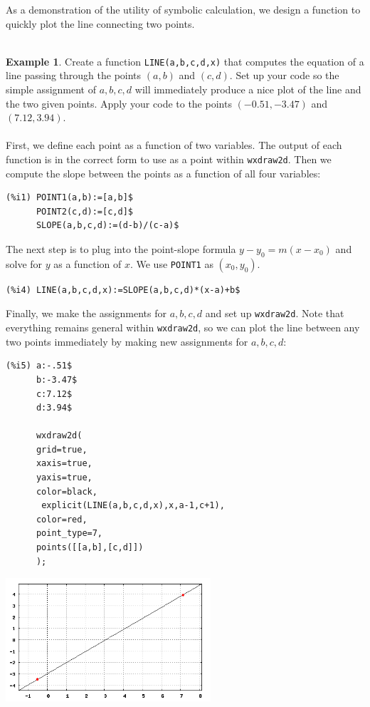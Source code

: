 \documentclass[10.5pt,twoside]{report}
\theoremstyle{definition}
\newtheorem{exmp}{Example}[section]
\begin{document}
As a demonstration of the utility of symbolic calculation, we design a function to quickly plot the line connecting two points.\\
${}$\\
\begin{exmp}  Create a function \verb|LINE(a,b,c,d,x)| that computes the equation of a line passing through the points $(a,b)$ and $(c,d)$.  Set up your code so the simple assignment of $a,b,c,d$ will immediately produce a nice plot of the line and the two given points.  Apply your code to the points $(-0.51,-3.47)$ and $(7.12,3.94)$.\\
${}$\\


First, we define each point as a function of two variables.  The output of each function is in the correct form to use as a point within \verb|wxdraw2d|.  Then we compute the slope between the points as a function of all four variables:\\

\begin{verbatim}
(%i1) POINT1(a,b):=[a,b]$
      POINT2(c,d):=[c,d]$
      SLOPE(a,b,c,d):=(d-b)/(c-a)$  
\end{verbatim}

The next step is to plug into the point-slope formula $y-y_0=m(x-x_0)$ and solve for $y$ as a function of $x$.  We use \verb|POINT1| as $(x_0,y_0)$.
           
\begin{verbatim}           
(%i4) LINE(a,b,c,d,x):=SLOPE(a,b,c,d)*(x-a)+b$
\end{verbatim}

Finally, we make the assignments for $a,b,c,d$ and set up \verb|wxdraw2d|.  Note that everything remains general within \verb|wxdraw2d|, so we can plot the line between any two points immediately by making new assignments for $a,b,c,d$:

\begin{verbatim}
(%i5) a:-.51$
      b:-3.47$
      c:7.12$
      d:3.94$

      wxdraw2d(
      grid=true,
      xaxis=true,
      yaxis=true,
      color=black,
       explicit(LINE(a,b,c,d,x),x,a-1,c+1),
      color=red,
      point_type=7,
      points([[a,b],[c,d]])
      );
\end{verbatim}

\includegraphics[width=3in]{example_0_6_1_1}
${}$\\


\end{exmp}
\end{document}
